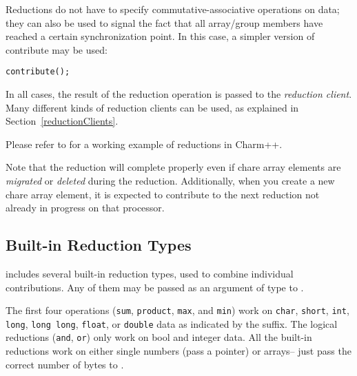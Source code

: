 Reductions do not have to specify commutative-associative operations on data;
they can also be used to signal the fact that all array/group members
have reached a certain synchronization point. In this case, a simpler version
of contribute may be used:


\begin{alltt}
    contribute();
\end{alltt}

In all cases, the result of the reduction operation is passed to the {\em reduction
client}.  Many different kinds of reduction clients can be used, as
explained in Section~\ref{reductionClients}.

Please refer to  for a working example of
reductions in Charm++.

Note that the reduction will complete properly even if chare array elements are {\em migrated}
or {\em deleted} during the reduction. Additionally, when you create a new chare array element, 
it is expected to contribute to the next reduction not already in progress on that
processor. 

\subsection{Built-in Reduction Types}
\label{builtin_reduction}

\charmpp{} includes several built-in reduction types, used to combine 
individual contributions.  Any of them may be passed as an argument of type
 to .

The first four operations ({\tt sum}, {\tt product}, {\tt max}, and {\tt min}) work on {\tt char},
{\tt short}, {\tt int}, {\tt long}, {\tt long long}, {\tt float}, or {\tt double} data as indicated
by the suffix.  The logical reductions ({\tt and}, {\tt or}) only work on bool and integer data.
All the built-in reductions work on either single numbers (pass a pointer) or arrays-- just
pass the correct number of bytes to .

